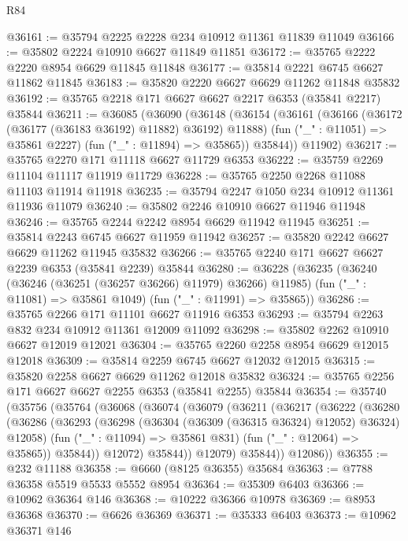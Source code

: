 \begin{lexlean}{R84}
\begin{coremodule}
@36161 := @35794 @2225 @2228 @234 @10912 @11361 @11839 @11049
@36166 := @35802 @2224 @10910 @6627 @11849 @11851
@36172 := @35765 @2222 @2220 @8954 @6629 @11845 @11848
@36177 := @35814 @2221 @6745 @6627 @11862 @11845
@36183 := @35820 @2220 @6627 @6629 @11262 @11848 @35832
@36192 := @35765 @2218 @171 @6627 @6627 @2217 @6353 (@35841 @2217) @35844
@36211 := @36085
    (@36090
      (@36148
        (@36154
          (@36161
            (@36166 (@36172 (@36177 (@36183 @36192) @11882) @36192) @11888)
            (fun ("_" : @11051) => @35861 @2227)
            (fun ("_" : @11894) => @35865))
          @35844))
      @11902)
@36217 := @35765 @2270 @171 @11118 @6627 @11729 @6353
@36222 := @35759 @2269 @11104 @11117 @11919 @11729
@36228 := @35765 @2250 @2268 @11088 @11103 @11914 @11918
@36235 := @35794 @2247 @1050 @234 @10912 @11361 @11936 @11079
@36240 := @35802 @2246 @10910 @6627 @11946 @11948
@36246 := @35765 @2244 @2242 @8954 @6629 @11942 @11945
@36251 := @35814 @2243 @6745 @6627 @11959 @11942
@36257 := @35820 @2242 @6627 @6629 @11262 @11945 @35832
@36266 := @35765 @2240 @171 @6627 @6627 @2239 @6353 (@35841 @2239) @35844
@36280 := @36228
    (@36235
      (@36240 (@36246 (@36251 (@36257 @36266) @11979) @36266) @11985)
      (fun ("_" : @11081) => @35861 @1049)
      (fun ("_" : @11991) => @35865))
@36286 := @35765 @2266 @171 @11101 @6627 @11916 @6353
@36293 := @35794 @2263 @832 @234 @10912 @11361 @12009 @11092
@36298 := @35802 @2262 @10910 @6627 @12019 @12021
@36304 := @35765 @2260 @2258 @8954 @6629 @12015 @12018
@36309 := @35814 @2259 @6745 @6627 @12032 @12015
@36315 := @35820 @2258 @6627 @6629 @11262 @12018 @35832
@36324 := @35765 @2256 @171 @6627 @6627 @2255 @6353 (@35841 @2255) @35844
@36354 := @35740
    (@35756
      (@35764
        (@36068
          (@36074
            (@36079
              (@36211
                (@36217
                  (@36222
                    (@36280
                      (@36286
                        (@36293
                          (@36298 (@36304 (@36309 (@36315 @36324) @12052) @36324) @12058)
                          (fun ("_" : @11094) => @35861 @831)
                          (fun ("_" : @12064) => @35865))
                        @35844))
                    @12072)
                  @35844))
              @12079)
            @35844))
        @12086))
@36355 := @232 @11188
@36358 := @6660 (@8125 @36355) @35684
@36363 := @7788 @36358 @5519 @5533 @5552 @8954
@36364 := @35309 @6403
@36366 := @10962 @36364 @146
@36368 := @10222 @36366 @10978
@36369 := @8953 @36368
@36370 := @6626 @36369
@36371 := @35333 @6403
@36373 := @10962 @36371 @146

\end{coremodule}
\end{lexlean}
